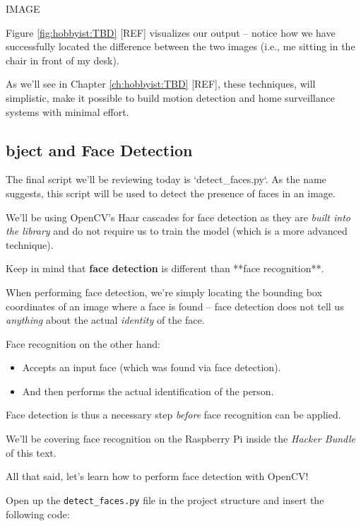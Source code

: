 IMAGE

Figure \ref{fig:hobbyist:TBD} [REF] visualizes our output -- notice how we have successfully located the difference between the two images (i.e., me sitting in the chair in front of my desk).

As we’ll see in Chapter \ref{ch:hobbyist:TBD} [REF], these techniques, will simplistic, make it possible to build motion detection and home surveillance systems with minimal effort.


\subsection{bject and Face Detection}

The final script we’ll be reviewing today is `detect_faces.py`. As the name suggests, this script will be used to detect the presence of faces in an image.

We’ll be using OpenCV’s Haar cascades for face detection as they are \textit{built into the library} and do not require us to train the model (which is a more advanced technique).

Keep in mind that \textbf{face detection} is different than **face recognition**.

When performing face detection, we’re simply locating the bounding box coordinates of an image where a face is found -- face detection does not tell us \textit{anything} about the actual \textit{identity} of the face.

Face recognition on the other hand:

\begin{itemize}
    \item Accepts an input face (which was found via face detection).
    \item And then performs the actual identification of the person.
\end{itemize}

Face detection is thus a necessary step \textit{before} face recognition can be applied.

We’ll be covering face recognition on the Raspberry Pi inside the \textit{Hacker Bundle} of this text.

All that said, let’s learn how to perform face detection with OpenCV!

Open up the \texttt{detect_faces.py} file in the project structure and insert the following code:

